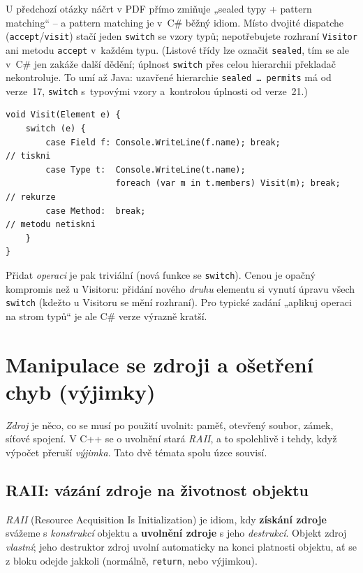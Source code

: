 \documentclass[11pt,a4paper]{article}
\newcommand{\cd}{\lstinline[style=cpp]}
\begin{document}
\begin{csalt}
U předchozí otázky náčrt v PDF přímo zmiňuje „sealed typy + pattern matching`` -- a pattern matching je v~C\# běžný idiom. Místo dvojité dispatche (\texttt{accept}/\texttt{visit}) stačí jeden \cd{switch} se vzory typů; nepotřebujete rozhraní \texttt{Visitor} ani metodu \texttt{accept} v~každém typu. (Listové třídy lze označit \cd{sealed}, tím se ale v~C\# jen zakáže další dědění; úplnost \cd{switch} přes celou hierarchii překladač nekontroluje. To umí až Java: uzavřené hierarchie \texttt{sealed \dots{} permits} má od verze~17, \cd{switch} s~typovými vzory a~kontrolou úplnosti od verze~21.)
\begin{lstlisting}[style=cs]
void Visit(Element e) {
    switch (e) {
        case Field f: Console.WriteLine(f.name); break;                  // tiskni
        case Type t:  Console.WriteLine(t.name);
                      foreach (var m in t.members) Visit(m); break;       // rekurze
        case Method:  break;                                             // metodu netiskni
    }
}
\end{lstlisting}
Přidat \emph{operaci} je pak triviální (nová funkce se \cd{switch}). Cenou je opačný kompromis než u Visitoru: přidání nového \emph{druhu} elementu si vynutí úpravu všech \cd{switch} (kdežto u Visitoru se mění rozhraní). Pro typické zadání „aplikuj operaci na strom typů`` je ale C\# verze výrazně kratší.
\end{csalt}

\section{Manipulace se zdroji a ošetření chyb (výjimky)}

\emph{Zdroj} je něco, co se musí po použití uvolnit: paměť, otevřený soubor, zámek, síťové spojení. V C++ se o uvolnění stará \emph{RAII}, a to spolehlivě i tehdy, když výpočet přeruší \emph{výjimka}. Tato dvě témata spolu úzce souvisí.

\subsection{RAII: vázání zdroje na životnost objektu}

\begin{definice}[RAII]
\emph{RAII} (Resource Acquisition Is Initialization) je idiom, kdy \textbf{získání zdroje} svážeme s \emph{konstrukcí} objektu a \textbf{uvolnění zdroje} s jeho \emph{destrukcí}. Objekt zdroj \emph{vlastní}; jeho destruktor zdroj uvolní automaticky na konci platnosti objektu, ať se z bloku odejde jakkoli (normálně, \cd{return}, nebo výjimkou).
\end{definice}
\end{document}
